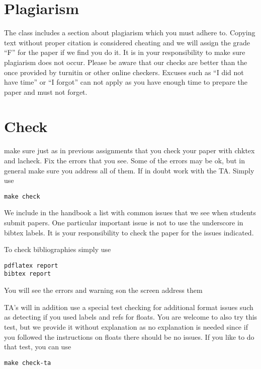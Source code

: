 \section{Plagiarism}

The class includes a section about plagiarism which you must adhere
to. Copying text without proper citation is considered cheating and we
will assign the grade ``F'' for the paper if we find you do it. It is
in your responsibility to make sure plagiarism does not occur. Please
be aware that our checks are better than the once provided by turnitin
or other online checkers. Excuses such as ``I did not have time'' or
``I forgot'' can not apply as you have enough time to prepare the
paper and must not forget. 

\section{Check}

make sure just as in previous assignments that you check your paper
with chktex and lacheck. Fix the errors that you see. Some of the
errors may be ok, but in general make sure you address all of them. If
in doubt work with the TA. Simply use

\begin{verbatim}
make check
\end{verbatim}

We include in the handbook a list with common issues that we see when
students submit papers. One particular important issue is not to use
the underscore in bibtex labels. It is your responsibility to check
the paper for the issues indicated.

To check bibliographies simply use

\begin{verbatim}
pdflatex report
bibtex report
\end{verbatim}

You will see the errors and warning son the screen address them

TA's will in addition use a special test checking for additional
format issues such as detecting if you used labels and refs for
floats. You are welcome to also try this test, but we provide it
without explanation as no explanation is needed since if you followed
the instructions on floats there should be no issues. If you like to
do that test, you can use  

\begin{verbatim}
make check-ta
\end{verbatim}

